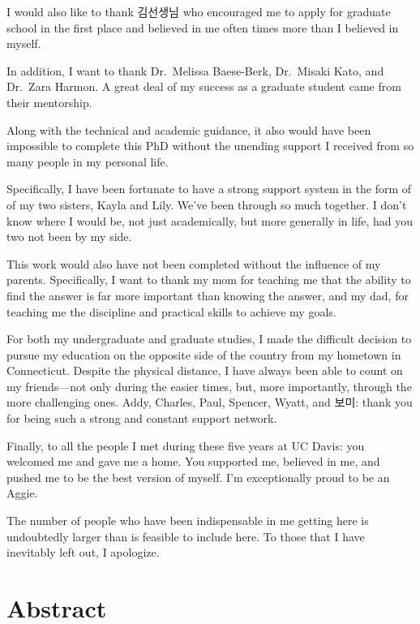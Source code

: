 \documentclass[
  12pt,
  letterpaper,
]{scrreprt}
\begin{document}
I would also like to thank 김선생님 who encouraged me to apply for
graduate school in the first place and believed in me often times more
than I believed in myself.

In addition, I want to thank Dr.~Melissa Baese-Berk, Dr.~Misaki Kato,
and Dr.~Zara Harmon. A great deal of my success as a graduate student
came from their mentorship.

Along with the technical and academic guidance, it also would have been
impossible to complete this PhD without the unending support I received
from so many people in my personal life.

Specifically, I have been fortunate to have a strong support system in
the form of of my two sisters, Kayla and Lily. We've been through so
much together. I don't know where I would be, not just academically, but
more generally in life, had you two not been by my side.

This work would also have not been completed without the influence of my
parents. Specifically, I want to thank my mom for teaching me that the
ability to find the answer is far more important than knowing the
answer, and my dad, for teaching me the discipline and practical skills
to achieve my goals.

For both my undergraduate and graduate studies, I made the difficult
decision to pursue my education on the opposite side of the country from
my hometown in Connecticut. Despite the physical distance, I have always
been able to count on my friends---not only during the easier times,
but, more importantly, through the more challenging ones. Addy, Charles,
Paul, Spencer, Wyatt, and 보미: thank you for being such a strong and
constant support network.

Finally, to all the people I met during these five years at UC Davis:
you welcomed me and gave me a home. You supported me, believed in me,
and pushed me to be the best version of myself. I'm exceptionally proud
to be an Aggie.

The number of people who have been indispensable in me getting here is
undoubtedly larger than is feasible to include here. To those that I
have inevitably left out, I apologize.

\newpage

\doublespacing

\setlength{\parindent}{4em}


\chapter*{Abstract}\label{sec-abstract}
\end{document}
